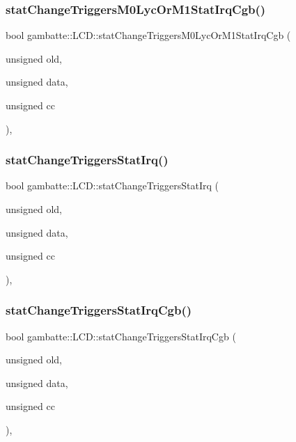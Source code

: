 \subsubsection{\texorpdfstring{stat\+Change\+Triggers\+M0\+Lyc\+Or\+M1\+Stat\+Irq\+Cgb()}{statChangeTriggersM0LycOrM1StatIrqCgb()}}
{\footnotesize\ttfamily bool gambatte\+::\+L\+C\+D\+::stat\+Change\+Triggers\+M0\+Lyc\+Or\+M1\+Stat\+Irq\+Cgb (\begin{DoxyParamCaption}\item[{unsigned}]{old,  }\item[{unsigned}]{data,  }\item[{unsigned}]{cc }\end{DoxyParamCaption})\hspace{0.3cm}{\ttfamily [inline]}, {\ttfamily [private]}}

\mbox{\label{classgambatte_1_1LCD_a6aca109bc8b45f097a799361d65e6964}} 
\subsubsection{\texorpdfstring{stat\+Change\+Triggers\+Stat\+Irq()}{statChangeTriggersStatIrq()}}
{\footnotesize\ttfamily bool gambatte\+::\+L\+C\+D\+::stat\+Change\+Triggers\+Stat\+Irq (\begin{DoxyParamCaption}\item[{unsigned}]{old,  }\item[{unsigned}]{data,  }\item[{unsigned}]{cc }\end{DoxyParamCaption})\hspace{0.3cm}{\ttfamily [inline]}, {\ttfamily [private]}}

\mbox{\label{classgambatte_1_1LCD_a45efb90e1520d0cf43f8f49b9890b4f1}} 
\subsubsection{\texorpdfstring{stat\+Change\+Triggers\+Stat\+Irq\+Cgb()}{statChangeTriggersStatIrqCgb()}}
{\footnotesize\ttfamily bool gambatte\+::\+L\+C\+D\+::stat\+Change\+Triggers\+Stat\+Irq\+Cgb (\begin{DoxyParamCaption}\item[{unsigned}]{old,  }\item[{unsigned}]{data,  }\item[{unsigned}]{cc }\end{DoxyParamCaption})\hspace{0.3cm}{\ttfamily [inline]}, {\ttfamily [private]}}

